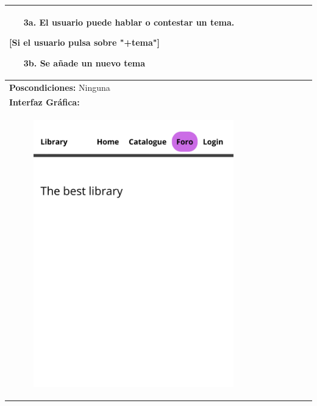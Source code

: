 \documentclass{report}
\begin{document}
\begin{center}
\begin{longtable}{|p{\linewidth}|}
\begin{enumerate}
                        \begin{enumerate}
                            \item[3a.] El usuario puede hablar o contestar un tema.
                        \end{enumerate}
                        [Si el usuario pulsa sobre "+tema"]
                        \begin{enumerate}
                            \item[3b.] Se añade un nuevo tema
                        \end{enumerate}
                    \end{enumerate}\\
                    \hline
                    \textbf{Poscondiciones:} Ninguna\\
                    \hline
                    \textbf{Interfaz Gráfica:}\\
                    \begin{figure}[H]
                        \centering
                        \includegraphics[width=0.8\textwidth]{./img/grafico/Foro1.png}
                    \end{figure}\\

\end{longtable}
\end{center}
\end{document}
